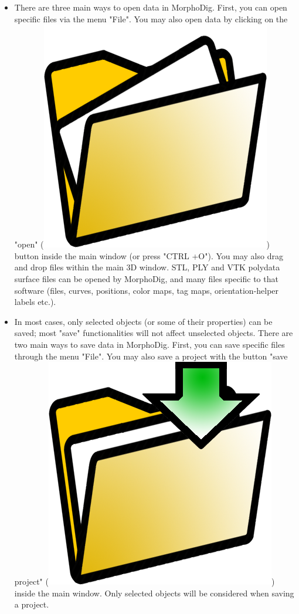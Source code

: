\begin{itemize}
\item There are three main ways to open data in MorphoDig. First, you can open specific files via the menu "File". You may also open data by clicking on the "open" (\includegraphics[scale=0.03]{images/03/open_data.png}) button inside the main window (or press "CTRL +O"). You may also drag and drop files within the main 3D window.  
STL, PLY and VTK polydata surface files can be opened by MorphoDig, and many files specific to that software (files, curves, positions, color maps, tag maps, orientation-helper labels etc.).
\item In most cases, only selected objects (or some of their properties) can be saved; most "save" functionalities will not affect unselected objects. There are two main ways to save data in MorphoDig. First, you can save specific files through the menu "File". You may also save a project with the button "save project" (\includegraphics[scale=0.03]{images/03/save_data.png})  inside the main window. Only selected objects will be considered when saving a project.
\end{itemize}





